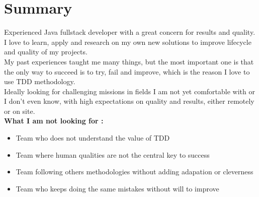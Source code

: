 \documentclass[]{friggeri-cv}
\begin{document}
\section{Summary}
Experienced Java fullstack developer with a great concern for results and quality.\\
I love to learn, apply and research on my own new solutions to improve lifecycle and quality of my projects.\\
My past experiences taught me many things, but the most important one is that the only way to succeed is to try, fail and improve, which is the reason I love to use TDD methodology.\\
Ideally looking for challenging missions in fields I am not yet comfortable with or I don't even know, with high expectations on quality and results, either remotely or on site.\\
\textbf{What I am not looking for :}
\begin{itemize}
\item Team who does not understand the value of TDD
\vspace{-\baselineskip}
\vspace{1 ex}
\item Team where human qualities are not the central key to success
\vspace{-\baselineskip}
\vspace{1 ex}
\item Team following others methodologies without adding adapation or cleverness
\vspace{-\baselineskip}
\vspace{1 ex}
\item Team who keeps doing the same mistakes without will to improve
\end{itemize}
\end{document}
